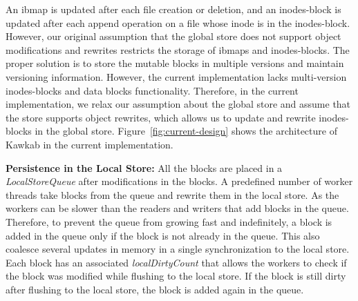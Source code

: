 \documentclass[]{article}
\newcommand{\subtopic}[1]{\vspace{1.5pt} \noindent \textbf{#1}}
\begin{document}
An ibmap is updated after each file creation or deletion, and an inodes-block
is updated after each append operation on a file whose inode is in the
inodes-block.  However, our original assumption that the global store does not
support object modifications and rewrites restricts the storage of ibmaps and
inodes-blocks. The proper solution is to store the mutable blocks in multiple
versions and maintain versioning information. However, the current
implementation lacks multi-version inodes-blocks and data blocks functionality.
Therefore, in the current implementation, we relax our assumption about the
global store and assume that the store supports object rewrites, which allows
us to update and rewrite inodes-blocks in the global store.
Figure~\ref{fig:current-design} shows the architecture of Kawkab in the
current implementation.



\subtopic{Persistence in the Local Store:} All the blocks are placed in a
\textit{LocalStoreQueue} after modifications in the blocks. A predefined number
of worker threads take blocks from the queue and rewrite them in the local
store.  As the workers can be slower than the readers and writers that add
blocks in the queue. Therefore, to prevent the queue from growing fast and
indefinitely, a block is added in the queue only if the block is not already in
the queue. This also coalesce several updates in memory in a single
synchronization to the local store.  Each block has an associated
\textit{localDirtyCount} that allows the workers to check if the block was modified
while flushing to the local store. If the block is still dirty after flushing
to the local store, the block is added again in the queue. 

\end{document}
